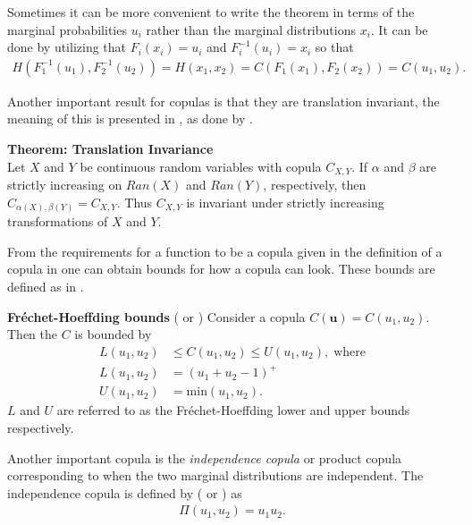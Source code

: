 Sometimes it can be more convenient to write the  theorem in terms of the marginal probabilities $u_i$ rather than the marginal distributions $x_i$. It can be done by utilizing that $F_i(x_i) = u_i$ and $F_i^{-1}(u_i)= x_i$ so that 
\begin{align*}
    H(F_1^{-1}(u_1),F_2^{-1}(u_2))=H(x_1,x_2) = C(F_1(x_1), F_2(x_2))= C(u_1, u_2).
\end{align*}

Another important result for copulas is that they are translation invariant, the meaning of this is presented in , as done by \citet[p.~25]{Nelsen2006}.

\begin{theorem}\label{the:TranslationInvariance}
        \textbf{Theorem: Translation Invariance}\\
        Let $X$ and $Y$ be continuous random variables with copula $C_{X, Y}$. If $\alpha$ and $\beta$ are strictly increasing on $Ran(X)$ and $Ran(Y)$, respectively, then $C_{\alpha(X),\beta(Y)}  = C_{X,Y}$. Thus $C_{X, Y}$ is invariant under strictly increasing transformations of $X$ and $Y$.
\end{theorem}

From the requirements for a function to be a copula given in the definition of a copula in  one can obtain bounds for how a copula can look. These bounds are defined as in .
    
\begin{theorem}\label{thm:FrechetBounds}
    \textbf{Fréchet-Hoeffding bounds} (\citet[p.~7]{Schmidt2006} or \citet[p.~11]{Nelsen2006})
    Consider a copula $C(\mathbf{u}) = C(u_1,u_2)$. Then the $C$ is bounded by
    \begin{align*}
        L(u_1,u_2) &\leq C(u_1,u_2) \leq U(u_1,u_2),\; \mathrm{ where}\\
        L(u_1,u_2) &= (u_1+u_2-1)^+\\
        U(u_1,u_2) &= \mathrm{min}(u_1,u_2).
    \end{align*}
    $L$ and $U$ are referred to as the Fréchet-Hoeffding lower and upper bounds respectively. 
\end{theorem}

Another important copula is the \emph{independence copula} or product copula corresponding to when the two marginal distributions are independent. The independence copula is defined by (\citet[p.~712]{BrigoMercurio2006} or \citet[p.~7]{Schmidt2006}) as
\begin{align*}
    \Pi(u_1,u_2) = u_1u_2.
\end{align*}

